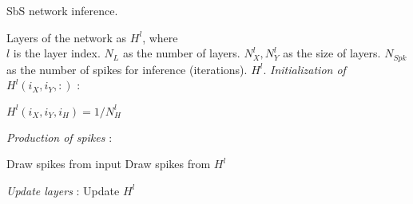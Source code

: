 \section*{}
\subsection{}
\label{sec:appendix_sbs_algorithm}


\begin{algorithm}[h!]
	\label{alg:inference}
	\caption{SbS network inference.}
	
	\begin{algorithmic}[1]
		\SetAlgoLined
		\renewcommand{\algorithmicrequire}{\textbf{input:}}
		\renewcommand{\algorithmicensure}{\textbf{output:}}
		\REQUIRE Layers of the network as $H^l$, where\\
		$l$ is the layer index.
		\REQUIRE $N_{L}$ as the number of layers.
		\REQUIRE $N^l_{X}, N^l_{Y}$ as the size of layers.
		\REQUIRE $N_{Spk}$ as the number of spikes for inference (iterations).
		\ENSURE $H^l$.
		\textit{Initialization of $H^l(i_X,i_Y,:)$} :
		
		\STATE $H^l(i_X,i_Y,i_{H}) = 1/N^l_H$
		\ENDFOR
		\ENDFOR
		\ENDFOR
		\ENDIF
		
		\textit{Production of spikes} :
		
		\STATE Draw spikes from input 
		\ELSE
		\STATE Draw spikes from $H^l$ 
		\ENDIF
		
		\ENDFOR
		
		\textit{Update layers} :
		\STATE Update $H^l$ 
		\ENDFOR
		
		\ENDFOR
	\end{algorithmic} 
\end{algorithm}


